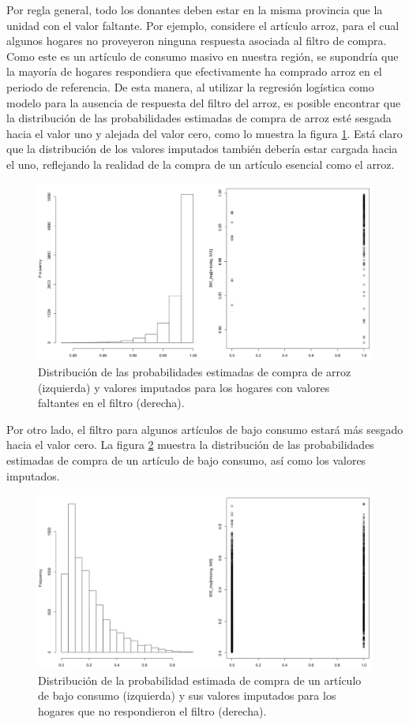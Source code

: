 \documentclass[
  12pt,
  spanish,
]{book}
\begin{document}
Por regla general, todo los donantes deben estar en la misma provincia que la unidad con el valor faltante. Por ejemplo, considere el artículo arroz, para el cual algunos hogares no proveyeron ninguna respuesta asociada al filtro de compra. Como este es un artículo de consumo masivo en nuestra región, se supondría que la mayoría de hogares respondiera que efectivamente ha comprado arroz en el periodo de referencia. De esta manera, al utilizar la regresión logística como modelo para la ausencia de respuesta del filtro del arroz, es posible encontrar que la distribución de las probabilidades estimadas de compra de arroz esté sesgada hacia el valor uno y alejada del valor cero, como lo muestra la figura \ref{fig:fig11}. Está claro que la distribución de los valores imputados también debería estar cargada hacia el uno, reflejando la realidad de la compra de un artículo esencial como el arroz.

\begin{figure}
\includegraphics[width=0.5\linewidth]{Pics/11} \caption{Distribución de las probabilidades estimadas de compra de arroz (izquierda) y valores imputados para los hogares con valores faltantes en el filtro (derecha).}\label{fig:fig11}
\end{figure}

Por otro lado, el filtro para algunos artículos de bajo consumo estará más sesgado hacia el valor cero. La figura \ref{fig:fig12} muestra la distribución de las probabilidades estimadas de compra de un artículo de bajo consumo, así como los valores imputados.

\begin{figure}
\includegraphics[width=0.5\linewidth]{Pics/12} \caption{Distribución de la probabilidad estimada de compra de un artículo de bajo consumo (izquierda) y sus valores imputados para los hogares que no respondieron el filtro (derecha).}\label{fig:fig12}
\end{figure}
\end{document}
